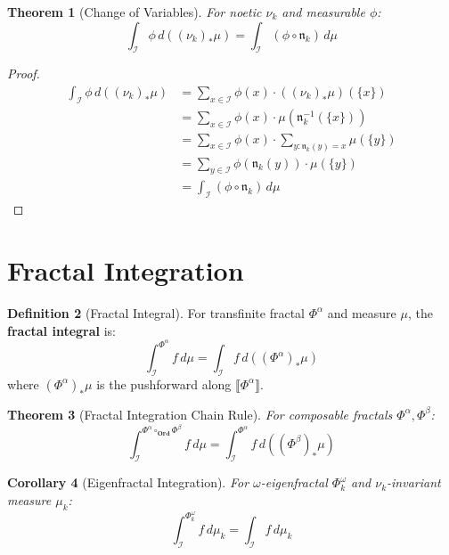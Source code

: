 \documentclass[11pt,twoside,openright]{book}
\theoremstyle{definition}
\newtheorem{definition}{Definition}[chapter]
\theoremstyle{plain}
\newtheorem{theorem}[definition]{Theorem}
\newtheorem{corollary}[definition]{Corollary}
\theoremstyle{remark}
\newcommand{\sem}[1]{\llbracket #1 \rrbracket}
\newcommand{\Ideas}{\mathcal{I}}
\newcommand{\noe}[1]{\nu_{#1}}
\newcommand{\Ord}{\mathbf{Ord}}              %
\newcommand{\TransFrac}[1]{\Phi^{#1}}        %
\newcommand{\intI}{\int_{\Ideas}}            %
\begin{document}
\begin{theorem}[Change of Variables]
\label{thm:change-variables}
For noetic $\noe{k}$ and measurable $\phi$:
\[
\intI \phi \, d((\noe{k})_* \mu) = \intI (\phi \circ \mathfrak{n}_k) \, d\mu
\]
\end{theorem}

\begin{proof}
\begin{align}
\intI \phi \, d((\noe{k})_* \mu) &= \sum_{x \in \Ideas} \phi(x) \cdot ((\noe{k})_* \mu)(\{x\}) \\
&= \sum_{x \in \Ideas} \phi(x) \cdot \mu(\mathfrak{n}_k^{-1}(\{x\})) \\
&= \sum_{x \in \Ideas} \phi(x) \cdot \sum_{y : \mathfrak{n}_k(y) = x} \mu(\{y\}) \\
&= \sum_{y \in \Ideas} \phi(\mathfrak{n}_k(y)) \cdot \mu(\{y\}) \\
&= \intI (\phi \circ \mathfrak{n}_k) \, d\mu
\end{align}
\end{proof}

\section{Fractal Integration}

\begin{definition}[Fractal Integral]
\label{def:fractal-integral}
For transfinite fractal $\TransFrac{\alpha}$ and measure $\mu$, the \textbf{fractal integral} is:
\[
\intI^{\TransFrac{\alpha}} f \, d\mu = \intI f \, d((\TransFrac{\alpha})_* \mu)
\]
where $(\TransFrac{\alpha})_* \mu$ is the pushforward along $\sem{\TransFrac{\alpha}}$.
\end{definition}

\begin{theorem}[Fractal Integration Chain Rule]
\label{thm:fractal-chain}
For composable fractals $\TransFrac{\alpha}, \TransFrac{\beta}$:
\[
\intI^{\TransFrac{\alpha} \circ_\Ord \TransFrac{\beta}} f \, d\mu = \intI^{\TransFrac{\alpha}} f \, d((\TransFrac{\beta})_* \mu)
\]
\end{theorem}

\begin{corollary}[Eigenfractal Integration]
\label{cor:eigenfractal-integration}
For $\omega$-eigenfractal $\TransFrac{\omega}_k$ and $\noe{k}$-invariant measure $\mu_k$:
\[
\intI^{\TransFrac{\omega}_k} f \, d\mu_k = \intI f \, d\mu_k
\]
\end{corollary}

\end{document}
